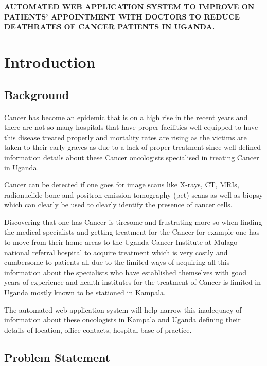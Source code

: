 \documentclass[12pt]{article}
\begin{document}
\vspace{6cm}

\title{}\textbf{\textbf{AUTOMATED WEB APPLICATION SYSTEM TO IMPROVE ON PATIENTS’ APPOINTMENT WITH DOCTORS TO REDUCE DEATHRATES OF CANCER PATIENTS IN UGANDA.}} 

\newpage




\section{Introduction}
\subsection{Background}

\paragraph{}Cancer has become an epidemic that is on a high rise in the recent years and there are not so many hospitals that have proper facilities well equipped to have this disease treated properly and mortality rates are rising as the victims are taken to their early graves as due to a lack of proper treatment since well-defined information details about these Cancer oncologists specialised in treating Cancer in Uganda.

Cancer can be detected if one goes for image scans like X-rays, CT, MRIs, radionuclide bone and positron emission tomography (pet) scans as well as biopsy which can clearly be used to clearly identify the presence of cancer cells.

Discovering that one has Cancer is tiresome and frustrating more so when finding the medical specialists and getting treatment for the Cancer for example one has to move from their home areas to the Uganda Cancer Institute at Mulago national referral hospital to acquire treatment which is very costly and cumbersome to patients all due to the limited ways of acquiring all this information about the specialists who have established themselves with good years of experience and health institutes for the treatment of Cancer is limited in Uganda mostly known to be stationed in Kampala.

The automated web application system will help narrow this inadequacy of information about these oncologists in Kampala and Uganda defining their details of location, office contacts, hospital base of practice.

\subsection{Problem Statement}
\end{document}
